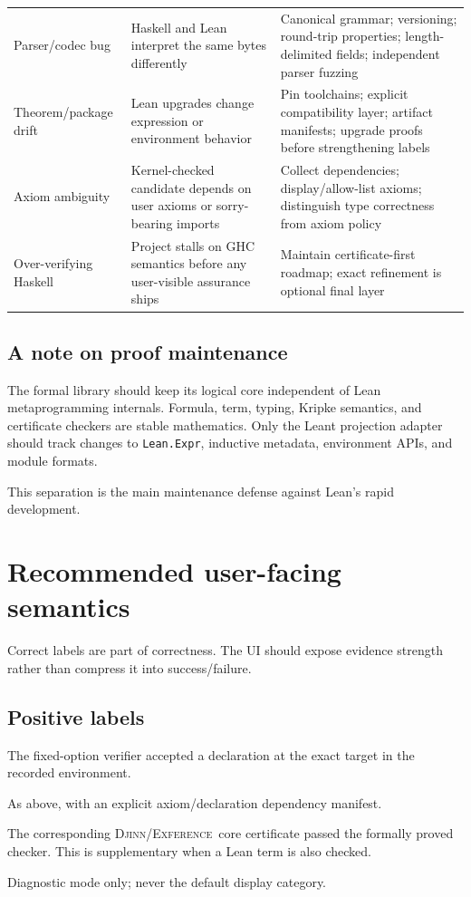 \documentclass[11pt,letterpaper,openany]{report}
\theoremstyle{definition}
\theoremstyle{remark}
\newcommand{\Djinn}{\textsc{Djinn}}
\newcommand{\Exference}{\textsc{Exference}}
\newcommand{\code}[1]{\texttt{#1}}
\begin{document}
\begin{longtable}{L{0.21\textwidth} L{0.31\textwidth} L{0.39\textwidth}}
Parser/codec bug & Haskell and Lean interpret the same bytes differently & Canonical grammar; versioning; round-trip properties; length-delimited fields; independent parser fuzzing \\
Theorem/package drift & Lean upgrades change expression or environment behavior & Pin toolchains; explicit compatibility layer; artifact manifests; upgrade proofs before strengthening labels \\
Axiom ambiguity & Kernel-checked candidate depends on user axioms or sorry-bearing imports & Collect dependencies; display/allow-list axioms; distinguish type correctness from axiom policy \\
Over-verifying Haskell & Project stalls on GHC semantics before any user-visible assurance ships & Maintain certificate-first roadmap; exact refinement is optional final layer \\
\bottomrule
\end{longtable}

\section{A note on proof maintenance}

The formal library should keep its logical core independent of Lean metaprogramming internals. Formula, term, typing, Kripke semantics, and certificate checkers are stable mathematics. Only the Leant projection adapter should track changes to \code{Lean.Expr}, inductive metadata, environment APIs, and module formats.

This separation is the main maintenance defense against Lean's rapid development.

\chapter{Recommended user-facing semantics}
\label{sec:wording}

Correct labels are part of correctness. The UI should expose evidence strength rather than compress it into success/failure.

\section{Positive labels}

\begin{description}[style=nextline]
\item[Lean-kernel verified candidate]
The fixed-option verifier accepted a declaration at the exact target in the recorded environment.
\item[Lean-kernel verified; dependencies listed]
As above, with an explicit axiom/declaration dependency manifest.
\item[Core-certificate checked]
The corresponding \Djinn/\Exference\ core certificate passed the formally proved checker. This is supplementary when a Lean term is also checked.
\item[Engine candidate, unverified]
Diagnostic mode only; never the default display category.
\end{description}
\end{document}
